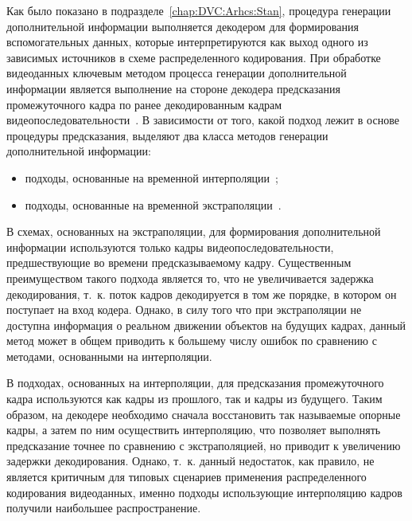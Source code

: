Как было показано в подразделе~\ref{chap:DVC:Arhcs:Stan}, процедура генерации дополнительной информации выполняется декодером для формирования вспомогательных данных, которые интерпретируются как выход одного из зависимых источников в схеме распределенного кодирования. При обработке видеоданных ключевым методом процесса генерации дополнительной информации является выполнение на стороне декодера предсказания промежуточного кадра по ранее декодированным кадрам видеопоследовательности~\cite{VeselovMonograph}. В зависимости от того, какой подход лежит в основе процедуры предсказания, выделяют два класса методов генерации дополнительной информации:
\begin{itemize}
    \item подходы, основанные на временной интерполяции~\cite{Huang2008};
    \item подходы, основанные на временной экстраполяции~\cite{Tome2009}.
\end{itemize}
В схемах, основанных на экстраполяции, для формирования дополнительной информации используются только кадры видеопоследовательности, предшествующие во времени предсказываемому кадру. Существенным преимуществом такого подхода является то, что не увеличивается задержка декодирования, т.~к. поток кадров декодируется в том же порядке, в котором он поступает на вход кодера. Однако, в силу того что при экстраполяции не доступна информация о реальном движении объектов на будущих кадрах, данный метод может в общем приводить к большему числу ошибок по сравнению с методами, основанными на интерполяции.

В подходах, основанных на интерполяции, для предсказания промежуточного кадра используются как кадры из прошлого, так и кадры из будущего. Таким образом, на декодере необходимо сначала восстановить так называемые опорные кадры, а затем по ним осуществить интерполяцию, что позволяет выполнять предсказание точнее по сравнению с экстраполяцией, но приводит к увеличению задержки декодирования. Однако, т.~к. данный недостаток, как правило, не является критичным для типовых сценариев применения распределенного кодирования видеоданных, именно подходы использующие интерполяцию кадров получили наибольшее распространение.

